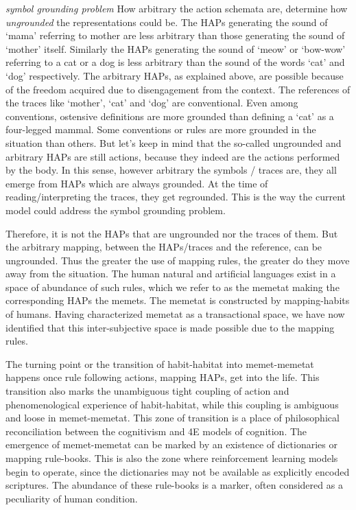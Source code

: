 \emph{symbol grounding problem} How arbitrary the action schemata are, determine how \textit{ungrounded} the representations could be. The HAPs generating the sound of `mama' referring to mother are less arbitrary than those generating the sound of `mother' itself. Similarly the HAPs generating the sound of `meow' or `bow-wow' referring to a cat or a dog is less arbitrary than the sound of the words `cat' and `dog' respectively. The arbitrary HAPs, as explained above, are possible because of the freedom acquired due to disengagement from the context. The references of the traces like `mother', `cat' and `dog' are conventional. Even among conventions, ostensive definitions are more grounded than defining a `cat' as a four-legged mammal. Some conventions or rules are more grounded in the situation than others. But let's keep in mind that the so-called ungrounded and arbitrary HAPs are still actions, because they indeed are the actions performed by the body. In this sense, however arbitrary the symbols / traces are, they all emerge from HAPs which are always grounded. At the time of reading/interpreting the traces, they get regrounded. This is the way the current model could address the symbol grounding problem.

Therefore, it is not the HAPs that are ungrounded nor the traces of them. But the arbitrary mapping, between the HAPs/traces and the reference, can be ungrounded. Thus the greater the use of mapping rules, the greater do they move away from the situation. The human natural and artificial languages exist in a space of abundance of such rules, which we refer to as the memetat making the corresponding HAPs the memets. The memetat is constructed by mapping-habits of humans. Having characterized memetat as a transactional space, we have now identified that this inter-subjective space is made possible due to the mapping rules. 

The turning point or the transition of habit-habitat into memet-memetat happens once rule following actions, mapping HAPs, get into the life. This transition also marks the unambiguous tight coupling of action and phenomenological experience of habit-habitat, while this coupling is ambiguous and loose in memet-memetat. This zone of transition is a place of philosophical reconciliation between the cognitivism and 4E models of cognition. The emergence of memet-memetat can be marked by an existence of dictionaries or mapping rule-books. This is also the zone where reinforcement learning models begin to operate, since the dictionaries may not be available as explicitly encoded scriptures. The abundance of these rule-books is a marker, often considered as a peculiarity of human condition.

